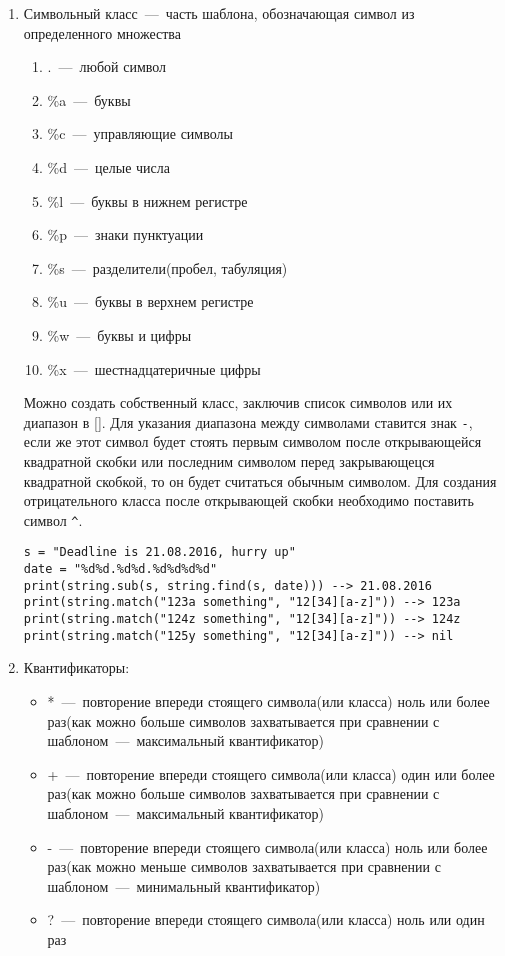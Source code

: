 \begin{enumerate}
	\item Символьный класс~---~часть шаблона, обозначающая символ из определенного множества
	
	\begin{enumerate}
	 \item .~---~любой символ
	 \item \%a~---~буквы
	 \item \%c~---~управляющие символы
	 \item \%d~---~целые числа
	 \item \%l~---~буквы в нижнем регистре
	 \item \%p~---~знаки пунктуации
	 \item \%s~---~разделители(пробел, табуляция)
	 \item \%u~---~буквы в верхнем регистре
	 \item \%w~---~буквы и цифры
	 \item \%x~---~шестнадцатеричные цифры
	\end{enumerate}
	
	Можно создать собственный класс, заключив список символов или их диапазон в []. Для указания диапазона между символами ставится знак \lstinline{-}, если же этот символ будет стоять первым символом после открывающейся квадратной скобки или последним символом перед закрывающецся квадратной скобкой, то он будет считаться обычным символом. Для создания отрицательного класса после открывающей скобки необходимо поставить символ \lstinline{^}. 
	
\begin{lstlisting}
s = "Deadline is 21.08.2016, hurry up"
date = "%d%d.%d%d.%d%d%d%d"
print(string.sub(s, string.find(s, date))) --> 21.08.2016
print(string.match("123a something", "12[34][a-z]")) --> 123a
print(string.match("124z something", "12[34][a-z]")) --> 124z
print(string.match("125y something", "12[34][a-z]")) --> nil
\end{lstlisting}
	
	\item Квантификаторы:
	\begin{itemize}
		\item *~---~повторение впереди стоящего символа(или класса) ноль или более раз(как можно больше символов захватывается при сравнении с шаблоном~---~максимальный квантификатор)
		\item +~---~повторение впереди стоящего символа(или класса) один или более раз(как можно больше символов захватывается при сравнении с шаблоном~---~максимальный квантификатор)
		\item -~---~повторение впереди стоящего символа(или класса) ноль или более раз(как можно меньше символов захватывается при сравнении с шаблоном~---~минимальный квантификатор)
		\item ?~---~повторение впереди стоящего символа(или класса) ноль или один раз
	\end{itemize}
	

\end{enumerate}
